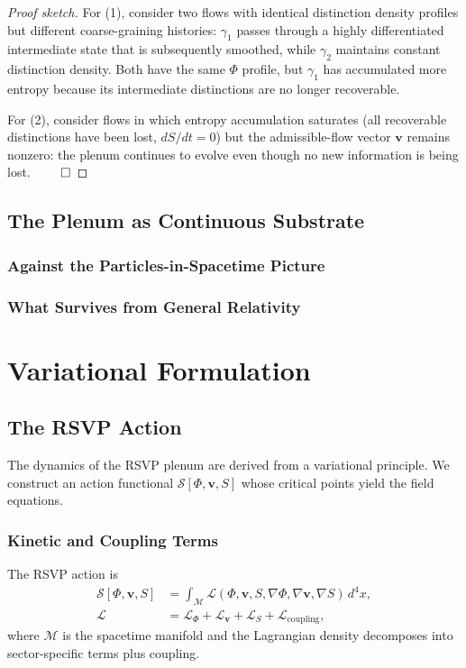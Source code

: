 \documentclass[12pt,a4paper,twoside,openright]{book}
\theoremstyle{plain}
\theoremstyle{definition}
\theoremstyle{remark}
\newcommand{\vfield}{\bm{v}}
\newcommand{\Sfield}{S}
\newcommand{\Phifield}{\Phi}
\begin{document}
\begin{proof}[Proof sketch]
For (1), consider two flows with identical distinction density profiles but different coarse-graining histories: $\gamma_1$ passes through a highly differentiated intermediate state that is subsequently smoothed, while $\gamma_2$ maintains constant distinction density. Both have the same $\Phifield$ profile, but $\gamma_1$ has accumulated more entropy because its intermediate distinctions are no longer recoverable.

For (2), consider flows in which entropy accumulation saturates (all recoverable distinctions have been lost, $d\Sfield/dt = 0$) but the admissible-flow vector $\vfield$ remains nonzero: the plenum continues to evolve even though no new information is being lost. $\qed$
\end{proof}

\section{The Plenum as Continuous Substrate}

\subsection{Against the Particles-in-Spacetime Picture}
\subsection{What Survives from General Relativity}


\chapter{Variational Formulation}
\label{ch:variational}

\section{The RSVP Action}

The dynamics of the RSVP plenum are derived from a variational principle. We construct an action functional $\mathcal{S}[\Phifield, \vfield, \Sfield]$ whose critical points yield the field equations.

\subsection{Kinetic and Coupling Terms}

The RSVP action is
\begin{align}
\mathcal{S}[\Phifield, \vfield, \Sfield] &= \int_{\mathcal{M}} \mathcal{L}(\Phifield, \vfield, \Sfield, \nabla\Phifield, \nabla\vfield, \nabla\Sfield) \, d^4x, \label{eq:action} \\
\mathcal{L} &= \mathcal{L}_\Phifield + \mathcal{L}_\vfield + \mathcal{L}_\Sfield + \mathcal{L}_{\mathrm{coupling}}, \nonumber
\end{align}
where $\mathcal{M}$ is the spacetime manifold and the Lagrangian density decomposes into sector-specific terms plus coupling.
\end{document}
